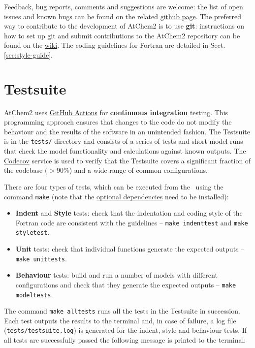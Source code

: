 Feedback, bug reports, comments and suggestions are welcome: the list
of open issues and known bugs can be found on the related
\href{https://github.com/AtChem/AtChem2/issues}{github page}. The
preferred way to contribute to the development of AtChem2 is to use
\textbf{git}: instructions on how to set up git and submit
contributions to the AtChem2 repository can be found on the
\href{https://github.com/AtChem/AtChem2/wiki/How-to-contribute}{wiki}.
The coding guidelines for Fortran are detailed in Sect.\ref{sec:style-guide}.

\section{Testsuite} \label{sec:test-suite}

AtChem2 uses \href{https://github.com/features/actions}{GitHub Actions} for
\textbf{continuous integration} testing. This programming approach
ensures that changes to the code do not modify the behaviour and the
results of the software in an unintended fashion. The Testsuite is in
the \texttt{tests/} directory and consists of a series of tests and
short model runs that check the model functionality and calculations
against known outputs. The \href{https://codecov.io}{Codecov} service
is used to verify that the Testsuite covers a significant fraction of
the codebase ($>$90\%) and a wide range of common configurations.

There are four types of tests, which can be executed from the
\maindir\ using the command \verb|make| (note that the
\hyperref[subsec:optional-dependencies]{optional dependencies} need to
be installed):

\begin{itemize}
\item \textbf{Indent} and \textbf{Style} tests: check that the
  indentation and coding style of the Fortran code are consistent with
  the guidelines -- \verb|make indenttest| and \verb|make styletest|.
\item \textbf{Unit} tests: check that individual functions generate
  the expected outputs -- \verb|make unittests|.
\item \textbf{Behaviour} tests: build and run a number of models with
  different configurations and check that they generate the expected
  outputs -- \verb|make modeltests|.
\end{itemize}

The command \verb|make alltests| runs all the tests in the Testsuite
in succession. Each test outputs the results to the terminal and, in
case of failure, a log file (\texttt{tests/testsuite.log}) is
generated for the indent, style and behaviour tests. If all tests are
successfully passed the following message is printed to the terminal:

